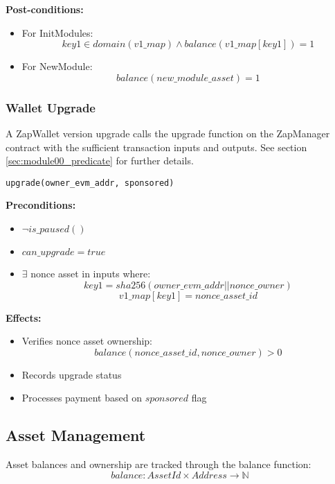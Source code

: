 \textbf{Post-conditions:}
\begin{itemize}
    \item For InitModules:
        \[ key1 \in domain(v1\_map) \land balance(v1\_map[key1]) = 1 \]
    \item For NewModule:
        \[ balance(new\_module\_asset) = 1 \]
\end{itemize}



\subsubsection{Wallet Upgrade}

A ZapWallet version upgrade calls the upgrade function on the ZapManager contract with the sufficient transaction inputs and outputs. See section \ref{sec:module00_predicate} for
further details.\\

\begin{lstlisting}
upgrade(owner_evm_addr, sponsored)
\end{lstlisting}

\textbf{Preconditions:}
\begin{itemize}
    \item $\neg is\_paused()$
    \item $can\_upgrade = true$
    \item $\exists$ nonce asset in inputs where:
        \[ key1 = sha256(owner\_evm\_addr || nonce\_owner) \]
        \[ v1\_map[key1] = nonce\_asset\_id \]
\end{itemize}

\textbf{Effects:}
\begin{itemize}
    \item Verifies nonce asset ownership:
        \[ balance(nonce\_asset\_id, nonce\_owner) > 0 \]
    \item Records upgrade status
    \item Processes payment based on $sponsored$ flag
\end{itemize}

\subsection{Asset Management}
Asset balances and ownership are tracked through the balance function:
\[ balance: AssetId \times Address \rightarrow \mathbb{N} \]


